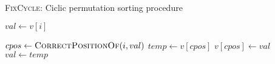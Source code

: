 \begin{algorithm}[H]
\caption{\textsc{FixCycle}: Ciclic permutation sorting procedure}
\label{alg:fix_cycle}      
\begin{algorithmic}[1]
    \State $val \gets v[i]$
	\Do
		
		\State $cpos \gets \textsc{CorrectPositionOf}(i, val)$
		\State $temp \gets v[cpos]$
		\State $v[cpos] \gets val$
		\State $val \gets temp$
\EndProcedure
\end{algorithmic}
\end{algorithm}